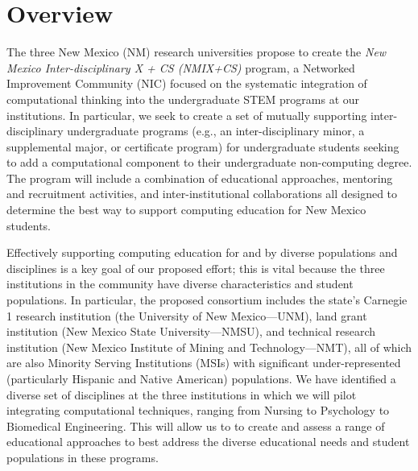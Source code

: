 \section{Overview}
\label{sec:overview}

The three New Mexico (NM) research universities propose to create the \emph{New Mexico Inter-disciplinary X + CS (NMIX+CS)} program, a Networked Improvement Community (NIC) focused on the systematic integration of computational thinking into the undergraduate STEM programs at our institutions. In particular, we seek to create
a set of mutually supporting inter-disciplinary undergraduate programs (e.g., an inter-disciplinary minor, a supplemental major, or
certificate program) for undergraduate students seeking to add a computational component to their undergraduate non-computing
degree. The program will include a combination of educational approaches, mentoring and recruitment activities, and inter-institutional collaborations all designed to determine the best way to support computing education for New Mexico students.

Effectively supporting computing education for and by diverse populations
and disciplines is a key goal of our proposed effort; this is vital because the three institutions in the community have diverse
characteristics and student populations. In particular, the proposed consortium includes the state's Carnegie 1 research institution (the University of New Mexico---UNM), land grant institution (New Mexico State University---NMSU), and technical research institution (New Mexico Institute of Mining and Technology---NMT), all of which
are also Minority Serving Institutions (MSIs) with significant under-represented (particularly Hispanic
and Native American) populations. We have identified a diverse set of disciplines at the three institutions in which we will pilot integrating computational techniques, ranging from Nursing to Psychology to Biomedical Engineering. This will allow us to to create and assess a range of educational approaches to best address the diverse educational needs and student populations in these programs.

